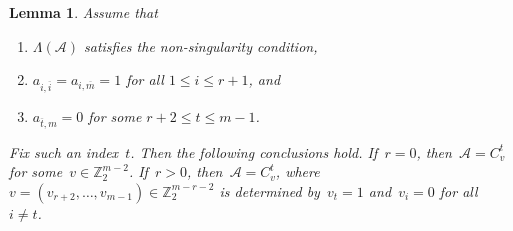 \documentclass[11pt]{amsart}
\theoremstyle{plain}
\newtheorem{lemma}[theorem]{Lemma}
\numberwithin{equation}{section}
\theoremstyle{definition}
\newcommand{\Z}{\mathbb{Z}}
\newcommand{\cA}{\mathcal{A}}
\begin{document}
\begin{lemma}\label{lemma:main3}
    Assume that 
    \begin{enumerate}
        \item $\Lambda(\cA)$ satisfies the non-singularity condition,
        \item $a_{i,\overline{i}}=a_{i,\overline{m}}=1$ for all $1\leq i\leq r+1$, and
        \item $a_{\overline{t},m}=0$ for some $r+2\leq t\leq m-1$.
    \end{enumerate}
    Fix such an index~$t$. 
    Then the following conclusions hold. 
    If~$r=0$, then~$\cA=C_v^t$ for some~$v\in \Z_2^{m-2}$. 
    If~$r>0$, then~$\cA=C_v^t$, where~$v=(v_{r+2},\ldots,v_{m-1})\in \Z_2^{m-r-2}$ is determined by~$v_t=1$ and~$v_i=0$ for all~$i\neq t$.
\end{lemma}
\end{document}
